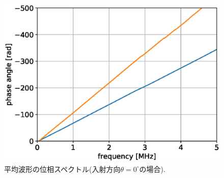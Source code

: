 \begin{figure}[h]
	\begin{center}
	\includegraphics[width=0.7\linewidth]{Figs/fig10.eps} 
	\end{center}
	\caption{
		平均波形の位相スペクトル(入射方向$\theta=0^{\circ}$の場合).
	} 
	\label{fig:fig10}
\end{figure}
